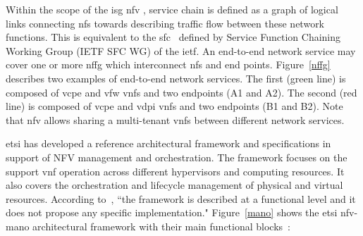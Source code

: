 Within the scope of the \gls{isg} \gls{nfv} \cite{ETSIIndustrySpecificationGroupISGNFV2014NetworkNFV}, service chain is defined as a graph of logical links connecting \glspl{nf} towards describing traffic flow between these network functions. This is equivalent to the \gls{sfc}~\cite{Halpern2015} defined by Service Function Chaining Working Group (IETF SFC WG) of the \gls{ietf}.  
An end-to-end network service may cover one or more \gls{nffg} which interconnect \glspl{nf} and end points.  Figure~\ref{nffg} describes two examples of end-to-end network services. The first (green line) is composed of \gls{vcpe} and \gls{vfw} \glspl{vnf} and two endpoints (A1 and A2). The second (red line) is composed of \gls{vcpe} and \gls{vdpi} \glspl{vnf} and two endpoints (B1 and B2). Note that \gls{nfv} allows sharing a multi-tenant \glspl{vnf} between different network services. 

\gls{etsi} has developed a reference architectural framework and specifications in support of NFV management and orchestration. The framework focuses on the support \gls{vnf} operation across different hypervisors and computing resources. It also covers the orchestration and lifecycle management of physical and virtual resources. According to~\cite{ETSIIndustrySpecificationGroupISGNFV2013NetworkFramework}, ``the framework is described at a functional level and it does not propose any specific implementation." Figure~\ref{mano} shows the \gls{etsi} \gls{nfv}-\acrfull{mano} architectural framework with their main functional blocks~\cite{ETSIIndustrySpecificationGroupISGNFV2014NetworkOptions}:

